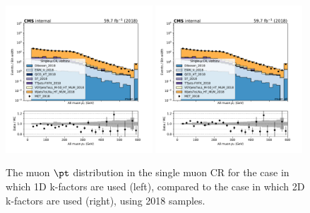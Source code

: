 \begin{figure}
    \begin{center}
        \includegraphics[width=0.49\textwidth]{fig/datamc/cr_1m_vbf/cr_1m_vbf_muon_pt_losf_2018.pdf}
        \includegraphics[width=0.49\textwidth]{fig/datamc_2dkfac/cr_1m_vbf/cr_1m_vbf_muon_pt_losf_2018.pdf} 
        \caption{The muon $\pt$ distribution in the single muon CR for the case in which 1D k-factors are used (left), 
        compared to the case in which 2D k-factors are used (right), using 2018 samples.}
        \label{fig:muon_pt_2018}
    \end{center}
\end{figure}

